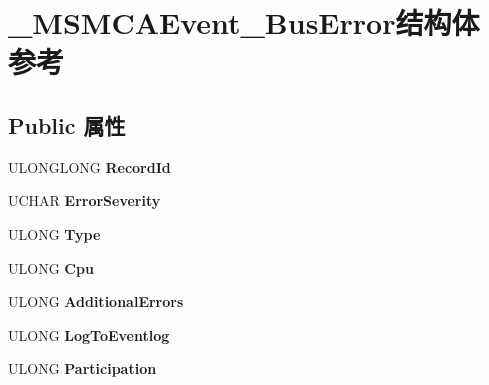 \hypertarget{struct___m_s_m_c_a_event___bus_error}{}\section{\+\_\+\+M\+S\+M\+C\+A\+Event\+\_\+\+Bus\+Error结构体 参考}
\label{struct___m_s_m_c_a_event___bus_error}
\subsection*{Public 属性}
\begin{DoxyCompactItemize}
\item 
\mbox{\label{struct___m_s_m_c_a_event___bus_error_a66ef940cf496a39063833e2dae8e650b}} 
U\+L\+O\+N\+G\+L\+O\+NG {\bfseries Record\+Id}
\item 
\mbox{\label{struct___m_s_m_c_a_event___bus_error_a4a384413028eda69bb95e60417411675}} 
U\+C\+H\+AR {\bfseries Error\+Severity}
\item 
\mbox{\label{struct___m_s_m_c_a_event___bus_error_aa7d10666eaaa05adf342e5977201d61f}} 
U\+L\+O\+NG {\bfseries Type}
\item 
\mbox{\label{struct___m_s_m_c_a_event___bus_error_ad894eee052624f30c8c29f4266d5afbe}} 
U\+L\+O\+NG {\bfseries Cpu}
\item 
\mbox{\label{struct___m_s_m_c_a_event___bus_error_a0be7430d73b5f2f6608e3b82b95c232e}} 
U\+L\+O\+NG {\bfseries Additional\+Errors}
\item 
\mbox{\label{struct___m_s_m_c_a_event___bus_error_afbeefdc4d2e7bcadc966ce1a25b5be48}} 
U\+L\+O\+NG {\bfseries Log\+To\+Eventlog}
\item 
\mbox{\label{struct___m_s_m_c_a_event___bus_error_ad1f2b19439c1ef5acd376fbb496f128b}} 
U\+L\+O\+NG {\bfseries Participation}
\item 
\mbox{\label{struct___m_s_m_c_a_event___bus_error_a8c01dd01f65cfad454e1e5b6bfdecc25}} 

\end{DoxyCompactItemize}
